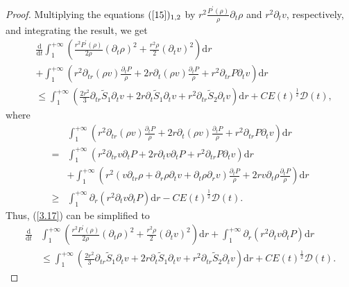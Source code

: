 \documentclass[10pt,reqno]{amsart}
\numberwithin{equation}{section}
\begin{document}
\begin{proof}
		Multiplying the equations $(\ref{15})_{1, 2}$ by $r^2 \frac{P^{\prime}(\rho)}{\rho} \partial_t \rho$ and $r^2 \partial_t v$, respectively, 
		and integrating the result,  we get
		\begin{equation}\label{3.17}
			\begin{aligned}
				&\frac{\mathrm{d}}{\mathrm{d} t} \int_{1}^{+\infty}\left(\frac{r^2P^{\prime}(\rho)}{2\rho} \left(\partial_t \rho\right)^2
				+ \frac{r^2\rho}{2}(\partial_tv)^2\right) \mathrm{d} r\\
				&+\int_{1}^{+\infty}
				\left(r^2 \partial_{tr}(\rho v) \frac{\partial_t P} {\rho}
				+2 r \partial_t(\rho v) \frac{\partial_t P}{\rho}
				+r^2 \partial_{tr}P \partial_t v\right)\mathrm{d} r\\
				&
				\leq\int_{1}^{+\infty}\left(\frac{2r^2}{3} \partial_{tr} \tilde{S}_1 \partial_{t}v + 2r \partial_t \tilde{S}_1  \partial_{t}v+r^2\partial_{tr} \tilde{S}_2 \partial_{t}v\right)\mathrm{d} r
				+C E(t)^{\frac{1}{2}}\mathcal{D}(t),	
			\end{aligned}
		\end{equation}
		where
		\begin{equation}\nonumber
			\begin{aligned}
				&\int_{1}^{+\infty}(r^2  \partial_{tr}(\rho v)  \frac{\partial_t P}{\rho}
				+2 r \partial_t(\rho v)  \frac{\partial_t P}{\rho}
				+r^2 \partial_{tr}P \partial_t v)\mathrm{d} r\\
				=&\int_{1}^{+\infty}(r^2 \partial_{tr}v \partial_t P+2r \partial_{t}v\partial_tP+r^2  \partial_{tr}P  \partial_t v)\mathrm{d} r\\
				&+\int_{1}^{+\infty}(r^2  (v\partial_{tr}\rho+\partial_{r}\rho\partial_{t}v+\partial_{t}\rho\partial_{r}v )  \frac{\partial_t P}{\rho}+2 r v \partial_t\rho  \frac{\partial_t P}{\rho})\mathrm{d} r\\
				\geq&\int_{1}^{+\infty}\partial_r(r^2  \partial_{t}v  \partial_t P)\mathrm{d} r-C E(t)^{\frac{1}{2}}\mathcal{D}(t).
			\end{aligned}
		\end{equation}
		Thus, (\ref{3.17}) can be simplified to
		\begin{equation}\label{3.18}
			\begin{aligned}
				\frac{\mathrm{d}}{\mathrm{d} t}& \int_{1}^{+\infty}\left(\frac{r^2P^{\prime}(\rho)}{2\rho} \left(\partial_t \rho\right)^2
				+ \frac{r^2\rho}{2}(\partial_tv)^2\right) \mathrm{d} r
				+\int_{1}^{+\infty}
				\partial_r(r^2  \partial_{t}v  \partial_t P)\mathrm{d} r\\
				&
				\leq\int_{1}^{+\infty}\left(\frac{2r^2}{3} \partial_{tr} \tilde{S}_1 \partial_{t}v + 2r \partial_t \tilde{S}_1  \partial_{t}v+r^2\partial_{tr} \tilde{S}_2 \partial_{t}v\right)\mathrm{d} r
				+C E(t)^{\frac{1}{2}}\mathcal{D}(t).
			\end{aligned}
		\end{equation}
		

\end{proof}
\end{document}

